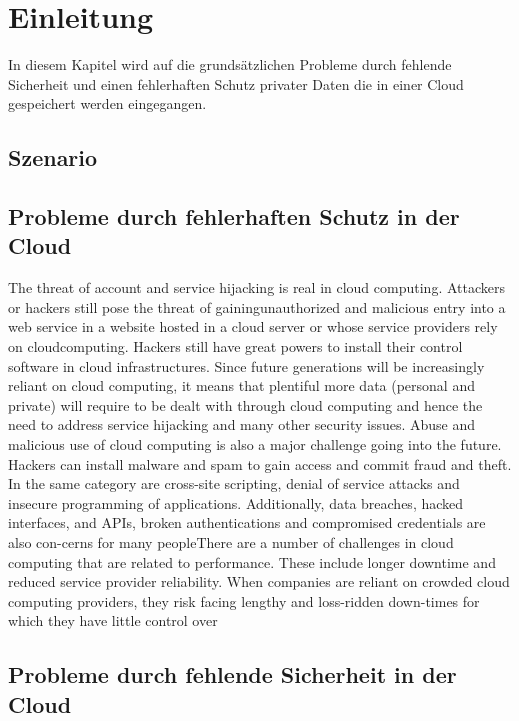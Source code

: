 \section{Einleitung}

In diesem Kapitel wird auf die grundsätzlichen Probleme durch fehlende Sicherheit und einen fehlerhaften Schutz privater Daten die in einer Cloud gespeichert werden eingegangen.



\subsection{Szenario}


\subsection{Probleme durch fehlerhaften Schutz in der Cloud}
The threat of account and service hijacking is real in cloud computing. Attackers or hackers still pose the threat of gainingunauthorized and malicious entry into a web service in a website hosted in a cloud server or whose service providers rely on cloudcomputing. Hackers still  have  great  powers  to  install their  control  software  in  cloud  infrastructures.  Since  future  generations  will be  increasingly  reliant on cloud computing, it means that plentiful more data (personal and private) will require to be dealt with through cloud computing and hence the need to address service hijacking and many other security issues. Abuse and malicious use of cloud computing is also a major challenge going into the future. Hackers can install malware and spam to gain access and commit fraud and theft. In the same category are cross-site scripting, denial of service attacks and insecure programming of applications. Additionally, data breaches, hacked interfaces, and APIs, broken authentications and compromised credentials are also con-cerns for many peopleThere are a number of challenges in cloud computing that are related to performance. These include longer downtime and reduced service provider reliability. When companies are reliant on crowded cloud computing providers, they risk facing lengthy and loss-ridden down-times  for  which  they  have  little  control  over \cite{Jabbar2020}

\subsection{Probleme durch fehlende Sicherheit in der Cloud}

\cite{inproceedings}

\cite{article}

\cite{patent}

\cite{book}

\cite{electronic}